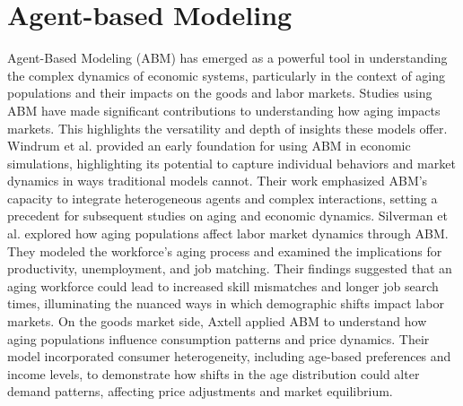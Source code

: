 \documentclass[ %
    final,
    scrbook,
    listoffigures,
    listoftables, 
    glossary]{cu-thesis}
\begin{document}


\iffalse
Source:  Statistical Survey Department, Statistics Bureau, Ministry of Internal Affairs and Communications.
Consumer Expenditure Surveys, https://www.bls.gov/cex/tables/calendar-year/mean-item-share-average-standard-error.htm
\fi


\section{Agent-based Modeling}
Agent-Based Modeling (ABM) has emerged as a powerful tool in understanding the complex dynamics of economic systems, particularly in the context of aging populations and their impacts on the goods and labor markets. Studies using ABM have made significant contributions to understanding how aging impacts markets. This highlights the versatility and depth of insights these models offer. Windrum et al. \cite{windrum2009consumer} provided an early foundation for using ABM in economic simulations, highlighting its potential to capture individual behaviors and market dynamics in ways traditional models cannot. Their work emphasized ABM's capacity to integrate heterogeneous agents and complex interactions, setting a precedent for subsequent studies on aging and economic dynamics. Silverman et al. \cite{silverman2013demography} explored how aging populations affect labor market dynamics through ABM. They modeled the workforce's aging process and examined the implications for productivity, unemployment, and job matching. Their findings suggested that an aging workforce could lead to increased skill mismatches and longer job search times, illuminating the nuanced ways in which demographic shifts impact labor markets. On the goods market side, Axtell \cite{axtell2016120} applied ABM to understand how aging populations influence consumption patterns and price dynamics. Their model incorporated consumer heterogeneity, including age-based preferences and income levels, to demonstrate how shifts in the age distribution could alter demand patterns, affecting price adjustments and market equilibrium.
\end{document}
